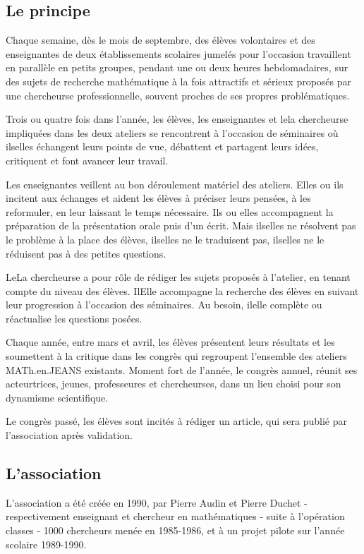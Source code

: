 \subsection*{Le principe} 
Chaque semaine, d\`es le mois de septembre, des \'el\`eves volontaires et des enseignant\mp e\mp s de deux \'etablissements scolaires jumel\'es pour l'occasion travaillent en parall\`ele en petits groupes, pendant une ou deux heures hebdomadaires, sur des sujets de recherche math\'ematique \`a la fois attractifs et s\'erieux propos\'es par un\mp e chercheur\mp se professionnel\mp le, souvent proches de ses propres probl\'ematiques.

Trois ou quatre fois dans l'ann\'ee, les \'el\`eves, les enseignant\mp e\mp s et le\mp la chercheur\mp se impliqu\'e\mp e\mp s dans les deux ateliers se rencontrent \`a l'occasion de \og s\'eminaires\fg{} o\`u ils\mp elles \'echangent leurs points de vue, d\'ebattent et partagent leurs id\'ees, critiquent et font avancer leur travail.

Les enseignant\mp e\mp s veillent au bon d\'eroulement mat\'eriel des ateliers. Elles ou ils incitent aux \'echanges et aident les \'el\`eves \`a pr\'eciser leurs pens\'ees, \`a les reformuler, en leur laissant le temps n\'ecessaire. Ils ou elles accompagnent la pr\'eparation de la pr\'esentation orale puis d'un \'ecrit. Mais ils\mp elles ne r\'esolvent pas le probl\`eme \`a la place des \'el\`eves, ils\mp elles ne le traduisent pas, ils\mp elles ne le r\'eduisent pas \`a des petites questions.

Le\mp La chercheur\mp se a pour r\^ole de r\'ediger les sujets propos\'es \`a l'atelier, en tenant compte du niveau des \'el\`eves. Il\mp Elle accompagne la recherche des \'el\`eves en suivant leur progression \`a l'occasion des s\'eminaires. Au besoin, il\mp elle compl\`ete ou r\'eactualise les questions pos\'ees.

Chaque ann\'ee, entre mars et avril, les \'el\`eves pr\'esentent leurs r\'esultats et les soumettent \`a la critique dans les congr\`es qui regroupent l'ensemble des ateliers MATh.en.JEANS existants. Moment fort de l'ann\'ee, le congr\`es annuel, r\'eunit ses acteur\mp trices, jeunes, professeur\mp e\mp s et chercheur\mp ses, dans un lieu choisi pour son dynamisme scientifique.

Le congr\`es pass\'e,  les \'el\`eves sont incit\'es \`a r\'ediger un article, qui sera publi\'e par l'association apr\`es validation.

\subsection*{L'association}
L'association a \'et\'e cr\'e\'ee en 1990, par Pierre Audin et Pierre Duchet - respectivement enseignant et chercheur en math\'ematiques - suite \`a l'op\'eration  classes - 1000 chercheurs\fg{} men\'ee en 1985-1986, et \`a un projet pilote sur l'ann\'ee scolaire 1989-1990.

